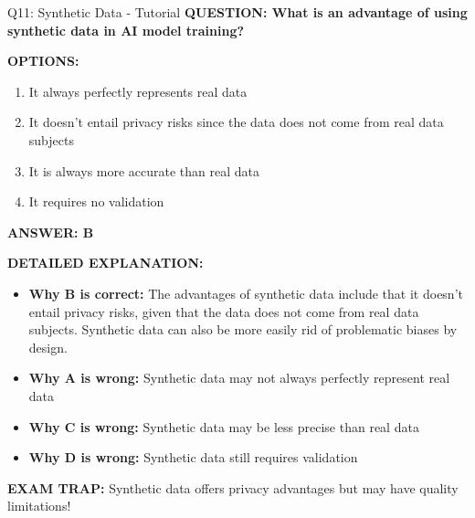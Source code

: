 \documentclass[8pt]{beamer}
\begin{document}
	\begin{frame}{Q11: Synthetic Data - Tutorial}
		\fontsize{6.5}{7.5}\selectfont
		\textbf{QUESTION: What is an advantage of using synthetic data in AI model training?}
		
		\vspace{0.1cm}
		\textbf{OPTIONS:}
		\begin{enumerate}
			\item It always perfectly represents real data
			\item It doesn't entail privacy risks since the data does not come from real data subjects
			\item It is always more accurate than real data
			\item It requires no validation
		\end{enumerate}
		
		\vspace{0.1cm}
		\textcolor{myblue}{\textbf{ANSWER: B}}
		
		\vspace{0.1cm}
		\textbf{DETAILED EXPLANATION:}
		\begin{itemize}
			\item \textbf{Why B is correct:} The advantages of synthetic data include that it doesn't entail privacy risks, given that the data does not come from real data subjects. Synthetic data can also be more easily rid of problematic biases by design.
			\item \textbf{Why A is wrong:} Synthetic data may not always perfectly represent real data
			\item \textbf{Why C is wrong:} Synthetic data may be less precise than real data
			\item \textbf{Why D is wrong:} Synthetic data still requires validation
		\end{itemize}
		
		\textcolor{myred}{\textbf{EXAM TRAP:}} Synthetic data offers \textcolor{myblue}{privacy advantages} but may have quality limitations!
	\end{frame}
	
\end{document}
